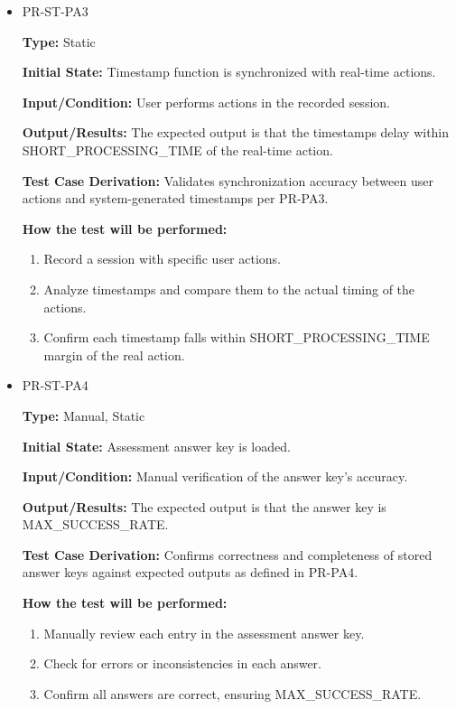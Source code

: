 \documentclass[12pt, titlepage]{article}
\begin{document}
\begin{itemize}
  \item PR-ST-PA3
  \begin{mdframed}[linewidth=0.5mm]
      \textbf{Type:} Static \par
      \textbf{Initial State:} Timestamp function is synchronized with real-time actions. \par
      \textbf{Input/Condition:} User performs actions in the recorded session. \par
      \textbf{Output/Results:} The expected output is that the timestamps delay within SHORT\_PROCESSING\_TIME of the real-time action. \par
      \textbf{Test Case Derivation:} Validates synchronization accuracy between user actions and system-generated timestamps per PR-PA3. \par
      \textbf{How the test will be performed:}
      \begin{enumerate}[noitemsep]
        \item Record a session with specific user actions.
        \item Analyze timestamps and compare them to the actual timing of the actions.
        \item Confirm each timestamp falls within SHORT\_PROCESSING\_TIME margin of the real action.
      \end{enumerate}
  \end{mdframed}

  \item PR-ST-PA4
  \begin{mdframed}[linewidth=0.5mm]
      \textbf{Type:} Manual, Static \par
      \textbf{Initial State:} Assessment answer key is loaded. \par
      \textbf{Input/Condition:} Manual verification of the answer key’s accuracy. \par
      \textbf{Output/Results:} The expected output is that the answer key is \\ MAX\_SUCCESS\_RATE. \par
      \textbf{Test Case Derivation:} Confirms correctness and completeness of stored answer keys against expected outputs as defined in PR-PA4. \par
      \textbf{How the test will be performed:}
      \begin{enumerate}[noitemsep]
        \item Manually review each entry in the assessment answer key.
        \item Check for errors or inconsistencies in each answer.
        \item Confirm all answers are correct, ensuring MAX\_SUCCESS\_RATE.
      \end{enumerate}
  \end{mdframed}
\end{itemize}
\end{document}
